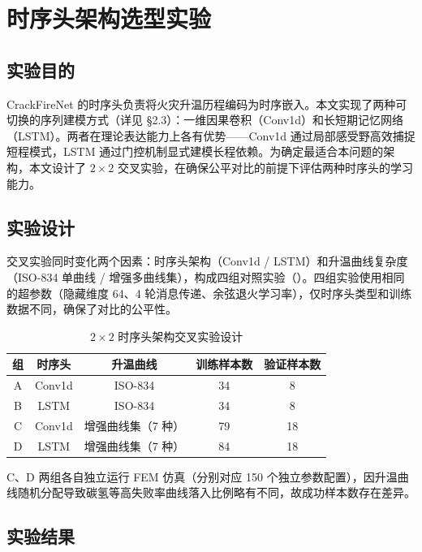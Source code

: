\section{时序头架构选型实验}
\label{sec:cross_exp}

\subsection{实验目的}

CrackFireNet 的时序头负责将火灾升温历程编码为时序嵌入。本文实现了两种可切换的序列建模方式（详见 \S2.3）：一维因果卷积（Conv1d）和长短期记忆网络（LSTM）。两者在理论表达能力上各有优势——Conv1d 通过局部感受野高效捕捉短程模式，LSTM 通过门控机制显式建模长程依赖。为确定最适合本问题的架构，本文设计了 $2 \times 2$ 交叉实验，在确保公平对比的前提下评估两种时序头的学习能力。

\subsection{实验设计}

交叉实验同时变化两个因素：时序头架构（Conv1d / LSTM）和升温曲线复杂度（ISO-834 单曲线 / 增强多曲线集），构成四组对照实验（）。四组实验使用相同的超参数（隐藏维度 64、4 轮消息传递、余弦退火学习率），仅时序头类型和训练数据不同，确保了对比的公平性。

\begin{table}[htbp]
\centering
\caption{$2 \times 2$ 时序头架构交叉实验设计}
\label{tab:cross_design}
\begin{tabular*}{\textwidth}{@{\extracolsep{\fill}}ccccc}
\toprule
组 & 时序头 & 升温曲线 & 训练样本数 & 验证样本数 \\
\midrule
A & Conv1d & ISO-834 & 34 & 8 \\
B & LSTM & ISO-834 & 34 & 8 \\
C & Conv1d & 增强曲线集（7 种） & 79 & 18 \\
D & LSTM & 增强曲线集（7 种） & 84 & 18 \\
\bottomrule
\end{tabular*}

\vspace{2pt}
{\small C、D 两组各自独立运行 FEM 仿真（分别对应 150 个独立参数配置），因升温曲线随机分配导致碳氢等高失败率曲线落入比例略有不同，故成功样本数存在差异。}
\end{table}

\subsection{实验结果}

